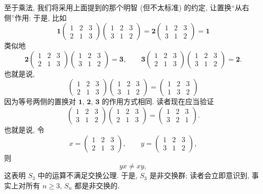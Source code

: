 至于乘法, 我们将采用上面提到的那个明智 (但不太标准) 的约定, 让置换``从右侧''作用: 于是, 比如
\[
\mathbf{1} \begin{pmatrix} 1 & 2 & 3 \\ 2 & 1 & 3 \end{pmatrix} \begin{pmatrix} 1 & 2 & 3 \\ 3 & 1 & 2 \end{pmatrix} = \mathbf{2} \begin{pmatrix} 1 & 2 & 3 \\ 3 & 1 & 2 \end{pmatrix} = \mathbf{1}
\]
类似地
\[
\mathbf{2} \begin{pmatrix} 1 & 2 & 3 \\ 2 & 1 & 3 \end{pmatrix} \begin{pmatrix} 1 & 2 & 3 \\ 3 & 1 & 2 \end{pmatrix} = \mathbf{3}, \qquad \mathbf{3} \begin{pmatrix} 1 & 2 & 3 \\ 2 & 1 & 3 \end{pmatrix} \begin{pmatrix} 1 & 2 & 3 \\ 3 & 1 & 2 \end{pmatrix} = \mathbf{2}.
\]
也就是说,
\[
\begin{pmatrix} 1 & 2 & 3 \\ 2 & 1 & 3 \end{pmatrix} \begin{pmatrix} 1 & 2 & 3 \\ 3 & 1 & 2 \end{pmatrix} = \begin{pmatrix} 1 & 2 & 3 \\ 1 & 3 & 2 \end{pmatrix}
\]
因为等号两侧的置换对 $\mathbf{1}$, $\mathbf{2}$, $\mathbf{3}$ 的作用方式相同. 读者现在应当验证
\[
\begin{pmatrix} 1 & 2 & 3 \\ 3 & 1 & 2 \end{pmatrix} \begin{pmatrix} 1 & 2 & 3 \\ 2 & 1 & 3 \end{pmatrix} = \begin{pmatrix} 1 & 2 & 3 \\ 3 & 2 & 1 \end{pmatrix}.
\]
也就是说, 令
\[
x = \begin{pmatrix} 1 & 2 & 3 \\ 2 & 1 & 3 \end{pmatrix}, \qquad y = \begin{pmatrix} 1 & 2 & 3 \\ 3 & 1 & 2 \end{pmatrix},
\]
则
\[
yx \neq xy,
\]
这表明 $S_3$ 中的运算不满足交换公理. 于是, $S_3$ 是非交换群; 读者会立即意识到, 事实上对所有 $n \geq 3$, $S_n$ 都是非交换的.


